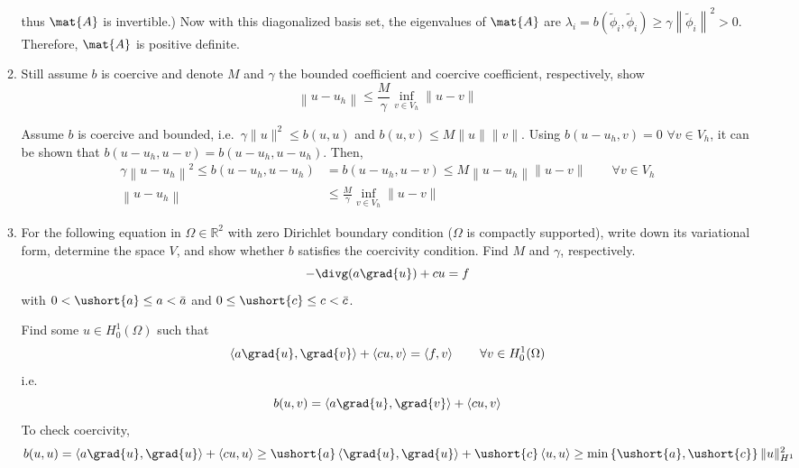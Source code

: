 \documentclass{article}
\newcommand\NoIndent[1]{%
  \begingroup
  \par
  \parshape0
  #1\par
  \endgroup
}
\begin{document}
\begin{enumerate}
\begin{enumerate}
{	thus $\mat{A}$ is invertible.)
	Now with this diagonalized basis set, the eigenvalues of $\mat{A}$ are
	$\lambda_i = b\left(\tilde{\phi}_i,\tilde{\phi}_i\right)
		\geq \gamma\left\|\tilde{\phi}_i\right\|^2 > 0$.
	Therefore, $\mat{A}$ is positive definite.
}
			\item Still assume $b$ is coercive and denote $M$ and $\gamma$ the bounded coefficient and
				coercive coefficient, respectively, show
				\begin{equation*}
					\left\|u - u_h\right\| \leq \frac{M}{\gamma}\inf_{v\in V_h}\|u - v\|
				\end{equation*}
\NoIndent{
	Assume $b$ is coercive and bounded, i.e.\ $\gamma\|u\|^2 \leq b(u,u)$ and $b(u,v) \leq M \|u\|\|v\|$.
	Using $b\left(u-u_h,v\right) = 0$ $\forall v \in V_h$, it can be shown that
	$b\left(u-u_h,u-v\right) = b\left(u-u_h,u-u_h\right)$.
	Then,
	\begin{align*}
		\gamma\left\|u-u_h\right\|^2 \leq b\left(u-u_h,u-u_h\right) &= b\left(u-u_h,u-v\right)
			\leq M \left\|u-u_h\right\|\|u-v\| \qquad \forall v \in V_h \\
		\left\|u - u_h\right\| &\leq \frac{M}{\gamma}\inf_{v\in V_h}\|u - v\|
	\end{align*}
}
			\item For the following equation in $\Omega \in \mathbb{R}^2$
				with zero Dirichlet boundary condition ($\Omega$ is compactly supported),
				write down its variational form, determine the space $V$,
				and show whether $b$ satisfies the coercivity condition.
				Find $M$ and $\gamma$, respectively.
				\begin{equation*}
					-\divg(a\grad{u}) + cu = f
				\end{equation*}
				with $0 < \ushort{a} \leq a < \bar{a}$ and $0 \leq \ushort{c} \leq c < \bar{c}$.
\NoIndent{
	Find some $u \in H_0^1(\Omega)$ such that
	\begin{equation*}
		\left<a\grad{u},\grad{v}\right> + \left<cu,v\right> = \left<f,v\right> \qquad \forall v \in H_0^1(\Omega)
	\end{equation*}
	i.e.
	\begin{equation*}
		b(u,v) = \left<a\grad{u},\grad{v}\right> + \left<cu,v\right>
	\end{equation*}
	To check coercivity,
	\begin{equation*}
		b(u,u) = \left<a\grad{u},\grad{u}\right> + \left<cu,u\right> \geq
			\ushort{a}\left<\grad{u},\grad{u}\right> + \ushort{c}\left<u,u\right> \geq
			\min\left\{\ushort{a},\ushort{c}\right\}\|u\|_{H^1}^2

\end{equation*}}
\end{enumerate}
\end{enumerate}
\end{document}
